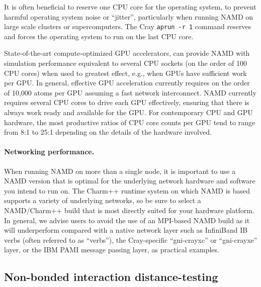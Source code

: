 It is often beneficial to reserve one CPU core for the 
operating system, to prevent harmful operating system noise or ``jitter'',
particularly when running NAMD on large scale clusters or supercomputers.
The Cray \texttt{aprun -r 1} command reserves and
forces the operating system to run on the last CPU core.

State-of-the-art compute-optimized GPU accelerators, 
can provide NAMD with simulation performance equivalent to 
several CPU sockets (on the order of 100 CPU cores) when used to 
greatest effect, e.g., when GPUs have sufficient work per GPU.
In general, effective GPU acceleration currently requires on the order
of 10,000 atoms per GPU assuming a fast network interconnect.
NAMD currently requires several CPU cores to drive each GPU effectively,
ensuring that there is always work ready and available for the GPU.
For contemporary CPU and GPU hardware, the most productive ratios of 
CPU core counts per GPU tend to range from 8:1 to 25:1 depending on 
the details of the hardware involved. 

\paragraph{Networking performance.}
When running NAMD on more than a single node, it is important to 
use a NAMD version that is optimal for the underlying network hardware
and software you intend to run on.  The Charm++ runtime system on which
NAMD is based supports a variety of underlying networks, so be sure to
select a NAMD/Charm++ build that is most directly suited for your 
hardware platform.  In general, we advise users to avoid the use of 
an MPI-based NAMD build as it will underperform compared with a native
network layer such as InfiniBand IB verbs (often referred to as ``verbs''),
the Cray-specific ``gni-crayxc'' or ``gni-crayxe'' layer,
or the IBM PAMI message passing layer, as practical examples.


\subsection{Non-bonded interaction distance-testing}

